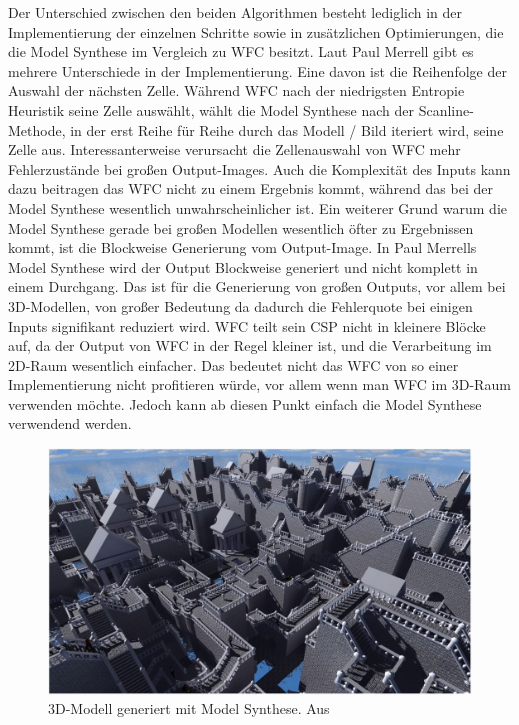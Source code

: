 \documentclass[12pt, a4paper,twoside,openright]{report} %
\begin{document}
Der Unterschied zwischen den beiden Algorithmen besteht lediglich in der Implementierung der einzelnen Schritte sowie in zusätzlichen Optimierungen,
die die Model Synthese im Vergleich zu WFC besitzt.
Laut Paul Merrell gibt es mehrere Unterschiede in der Implementierung.
\newline
Eine davon ist die Reihenfolge der Auswahl der nächsten Zelle.
Während WFC nach der niedrigsten Entropie Heuristik seine Zelle auswählt,
wählt die Model Synthese nach der Scanline-Methode, in der erst Reihe für Reihe durch das Modell / Bild iteriert wird, seine Zelle aus.
Interessanterweise verursacht die Zellenauswahl von WFC mehr Fehlerzustände bei großen Output-Images.
Auch die Komplexität des Inputs kann dazu beitragen das WFC nicht zu einem Ergebnis kommt, während das bei der Model Synthese wesentlich unwahrscheinlicher ist.
\newline
Ein weiterer Grund warum die Model Synthese gerade bei großen Modellen wesentlich öfter zu Ergebnissen kommt, ist die Blockweise Generierung vom Output-Image.
In Paul Merrells Model Synthese wird der Output Blockweise generiert und nicht komplett in einem Durchgang.
Das ist für die Generierung von großen Outputs, vor allem bei 3D-Modellen, von großer Bedeutung da dadurch die Fehlerquote bei einigen Inputs signifikant reduziert wird.
WFC teilt sein CSP nicht in kleinere Blöcke auf, da der Output von WFC in der Regel kleiner ist, und die Verarbeitung im 2D-Raum wesentlich einfacher.
Das bedeutet nicht das WFC von so einer Implementierung nicht profitieren würde, vor allem wenn man WFC im 3D-Raum verwenden möchte.
Jedoch kann ab diesen Punkt einfach die Model Synthese verwendend werden. \cite{merrell2018compare}

\begin{figure}[H]
    \centering
    \includegraphics[width=1\linewidth]{images/3D-model-synthese.JPG}%
    \caption{3D-Modell generiert mit Model Synthese. Aus \cite{merrell2018compare}}%
\end{figure}
\end{document}
